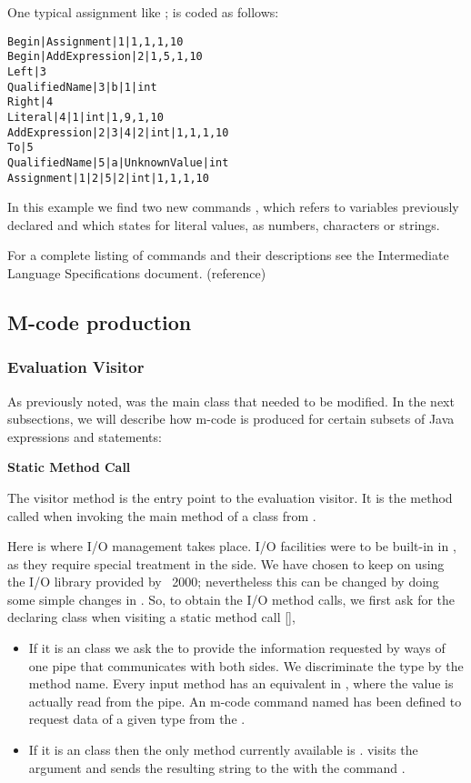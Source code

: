 One typical assignment like ; is coded as follows:
\begin{verbatim}
Begin|Assignment|1|1,1,1,10
Begin|AddExpression|2|1,5,1,10
Left|3
QualifiedName|3|b|1|int
Right|4
Literal|4|1|int|1,9,1,10
AddExpression|2|3|4|2|int|1,1,1,10
To|5
QualifiedName|5|a|UnknownValue|int
Assignment|1|2|5|2|int|1,1,1,10
\end{verbatim}

In this example we find two new commands ,
which refers to variables previously declared and  which states
for literal values, as numbers, characters or strings.

For a complete listing of commands and their descriptions see the
Intermediate Language Specifications document. (reference)

\subsection{M-code production}

\subsubsection{Evaluation Visitor}

As previously noted,  was the main class that
needed to be modified. In the next subsections, we will describe
how {m-code} is produced for certain subsets of Java expressions
and statements:

{\bf{Static Method Call}}

The visitor method  is the entry point to the
evaluation visitor. It is the method called when invoking the main
method of a class from .

Here is where I/O management takes place. I/O facilities were to
be built-in in \djava{}, as they require special treatment in the
\jel{} side. We have chosen to keep on using the I/O library
provided by \jel{}~2000; nevertheless this can be changed by doing
some simple changes in . So, to obtain the
I/O method calls, we first ask for the declaring class when
visiting a static method call [],

\begin{itemize}
\item If it is an  class we ask the  to provide the information requested by ways of one
pipe that communicates with both sides. We discriminate the type
by the method name. Every input method has an equivalent in
, where the value is actually read from the
pipe. An m-code command named  has been defined to
request data of a given type from the . \item If it is
an  class then the only method currently available is
. \djava{} visits the argument and sends the resulting
string to the  with the command
.
\end{itemize}

